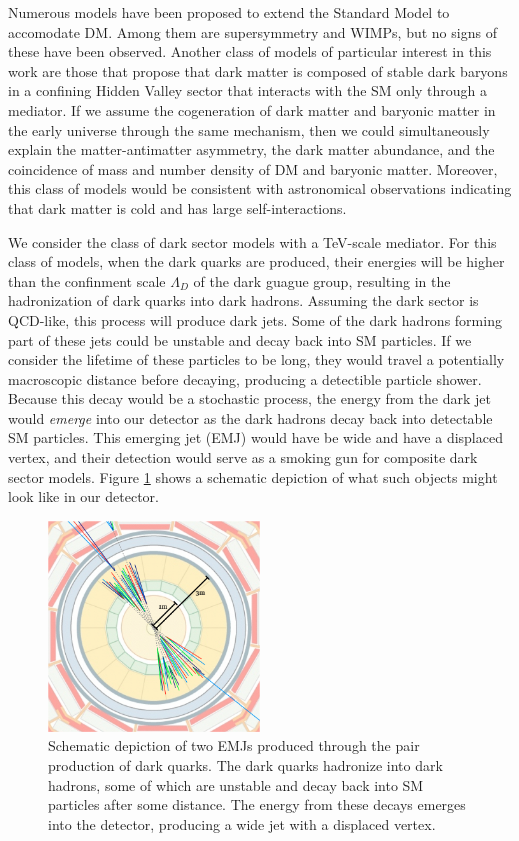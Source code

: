 Numerous models have been proposed to extend the Standard Model to accomodate DM. Among them are supersymmetry and WIMPs, but no signs of these have been observed. Another class of models of particular interest in this work are those that propose that dark matter is composed of stable dark baryons in a confining Hidden Valley sector that interacts with the SM only through a mediator. If we assume the cogeneration of dark matter and baryonic matter in the early universe through the same mechanism, then we could simultaneously explain the matter-antimatter asymmetry, the dark matter abundance, and the coincidence of mass and number density of DM and baryonic matter. Moreover, this class of models would be consistent with astronomical observations indicating that dark matter is cold and has large self-interactions.

We consider the class of dark sector models with a TeV-scale mediator. For this class of models, when the dark quarks are produced, their energies will be higher than the confinment scale $\Lambda_D$ of the dark guague group, resulting in the hadronization of dark quarks into dark hadrons. Assuming the dark sector is QCD-like, this process will produce dark jets. Some of the dark hadrons forming part of these jets could be unstable and decay back into SM particles. If we consider the lifetime of these particles to be long, they would travel a potentially macroscopic distance before decaying, producing a detectible particle shower. Because this decay would be a stochastic process, the energy from the dark jet would \textit{emerge} into our detector as the dark hadrons decay back into detectable SM particles. This emerging jet (EMJ) would have be wide and have a displaced vertex, and their detection would serve as a smoking gun for composite dark sector models. Figure \ref{fig:emj} shows a schematic depiction of what such objects might look like in our detector.

\begin{figure}[h]
	\centering
	\includegraphics[width=0.5\textwidth]{images/emj.png}
	\caption{Schematic depiction of two EMJs produced through the pair production of dark quarks. The dark quarks hadronize into dark hadrons, some of which are unstable and decay back into SM particles after some distance. The energy from these decays emerges into the detector, producing a wide jet with a displaced vertex.}
	\label{fig:emj}
\end{figure}

